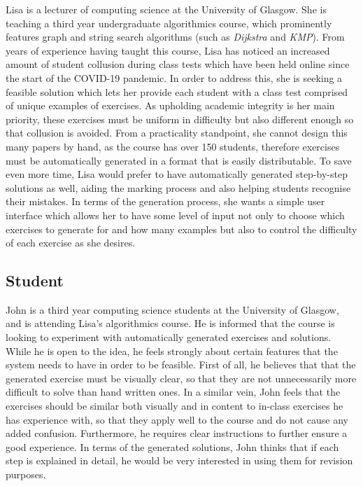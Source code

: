 \documentclass{l4proj}
\begin{document}
Lisa is a lecturer of computing science at the University of Glasgow. She is teaching a third year undergraduate algorithmics course, which prominently features graph and string search algorithms (such as \emph{Dijkstra} and \emph{KMP}). From years of experience having taught this course, Lisa has noticed an increased amount of student collusion during class tests which have been held online since the start of the COVID-19 pandemic. In order to address this, she is seeking a feasible solution which lets her provide each student with a class test comprised of unique examples of exercises. As upholding academic integrity is her main priority, these exercises must be uniform in difficulty but also different enough so that collusion is avoided. From a practicality standpoint, she cannot design this many papers by hand, as the course has over 150 students, therefore exercises must be automatically generated in a format that is easily distributable. To save even more time, Lisa would prefer to have automatically generated step-by-step solutions as well, aiding the marking process and also helping students recognise their mistakes. In terms of the generation process, she wants a simple user interface which allows her to have some level of input not only to choose which exercises to generate for and how many examples but also to control the difficulty of each exercise as she desires.

\subsection{Student}

John is a third year computing science students at the University of Glasgow, and is attending Lisa's algorithmics course. He is informed that the course is looking to experiment with automatically generated exercises and solutions. While he is open to the idea, he feels strongly about certain features that the system needs to have in order to be feasible. First of all, he believes that that the generated exercise must be visually clear, so that they are not unnecessarily more difficult to solve than hand written ones. In a similar vein, John feels that the exercises should be similar both visually and in content to in-class exercises he has experience with, so that they apply well to the course and do not cause any added confusion. Furthermore, he requires clear instructions to further ensure a good experience. In terms of the generated solutions, John thinks that if each step is explained in detail, he would be very interested in using them for revision purposes.
\end{document}
